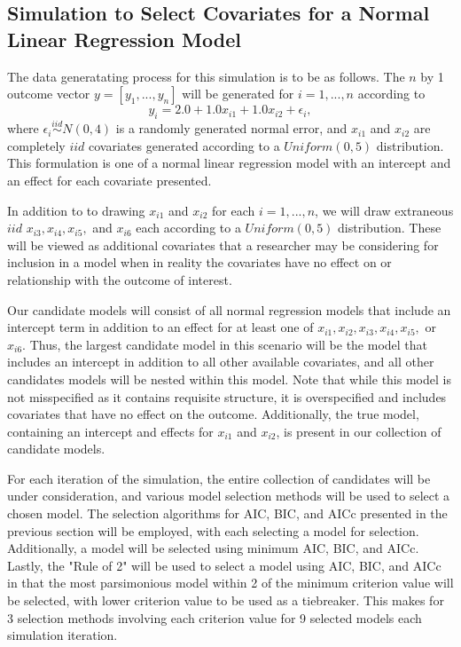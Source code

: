 		\subsection{Simulation to Select Covariates for a Normal Linear Regression Model}

		The data generatating process for this simulation is to be as follows. The $n$ by 1 outcome vector $y = [y_1,...,y_n]$ will be generated for $i = 1,...,n$ according
		to
		\begin{equation}
			y_i = 2.0 + 1.0 x_{i1} + 1.0 x_{i2} + \epsilon_i , 
		\end{equation}
		where $\epsilon_i \stackrel{iid}{\sim} N(0,4)$ is a randomly generated normal error, and $x_{i1}$ and $x_{i2}$ are completely $iid$ covariates generated according to
		a $Uniform(0,5)$ distribution. This formulation is one of a normal linear regression model with an intercept and an effect for each covariate presented.

		In addition to to drawing $x_{i1}$ and $x_{i2}$ for each $i=1,...,n$, we will draw extraneous $iid$ $x_{i3},x_{i4},x_{i5},$ and $x_{i6}$ each according to a
		$Uniform(0,5)$ distribution. These will be viewed as additional covariates that a researcher may be considering for inclusion in a model when in reality the covariates have
		no effect on or relationship with the outcome of interest.
		
		Our candidate models will consist of all normal regression models that include an intercept term in addition to an effect for at least one of 
		$x_{i1},x_{i2},x_{i3},x_{i4},x_{i5},$ or $x_{i6}$. Thus, the largest candidate model in this scenario will be the model that includes an intercept
		in addition to all other available covariates, and all other candidates models will be nested within this model. Note that while this model is not
		misspecified as it contains requisite structure, it is overspecified and includes covariates that have no effect on the outcome. Additionally, the
		true model, containing an intercept and effects for $x_{i1}$ and $x_{i2}$, is present in our collection of candidate models.

		For each iteration of the simulation, the entire collection of candidates will be under consideration, and various model selection methods will be
		used to select a chosen model. The selection algorithms for AIC, BIC, and AICc presented in the previous section will be employed, with each selecting a model
		for selection. Additionally, a model will be selected using minimum AIC, BIC, and AICc. Lastly, the "Rule of 2" will be used to select a model using AIC,
		BIC, and AICc in that the most parsimonious model within 2 of the minimum criterion value will be selected, with lower criterion value to be used as a 
		tiebreaker. This makes for 3 selection methods involving each criterion value for 9 selected models each simulation iteration.

